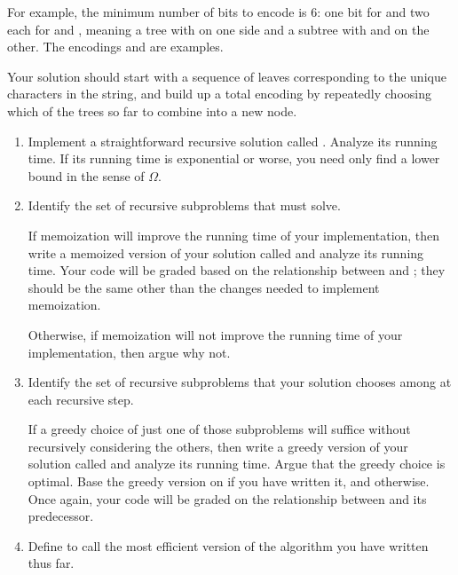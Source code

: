 \documentclass{article}
\begin{document}
\begin{enumerate}
    For example, the minimum number of bits to encode  is 6: one
    bit for  and two each for  and , meaning a
    tree with  on one side and a subtree with  and
     on the other.  The encodings  and
     are examples.

    Your solution should start with a sequence of leaves corresponding to the
    unique characters in the string, and build up a total encoding by repeatedly
    choosing which of the trees so far to combine into a new node.

    \begin{enumerate}

    \item Implement a straightforward recursive solution called
      .  Analyze its running time.  If its running
      time is exponential or worse, you need only find a lower bound in the
      sense of \(\Omega\).

    \item Identify the set of recursive subproblems that
       must solve.

      If memoization will improve the running time of your implementation, then
      write a memoized version of your solution called 
      and analyze its running time.  Your code will be graded based on the
      relationship between  and
      ; they should be the same other than the changes
      needed to implement memoization.

      Otherwise, if memoization will not improve the running time of your
      implementation, then argue why not.

    \item Identify the set of recursive subproblems that your solution chooses
      among at each recursive step.

      If a greedy choice of just one of those subproblems will suffice without
      recursively considering the others, then write a greedy version of your
      solution called  and analyze its running time.
      Argue that the greedy choice is optimal.  Base the greedy version on
       if you have written it, and
       otherwise.  Once again, your code will be graded
      on the relationship between  and its predecessor.

    \item Define  to call the most efficient version of the
      algorithm you have written thus far.

    \end{enumerate}

\end{enumerate}
\end{document}
